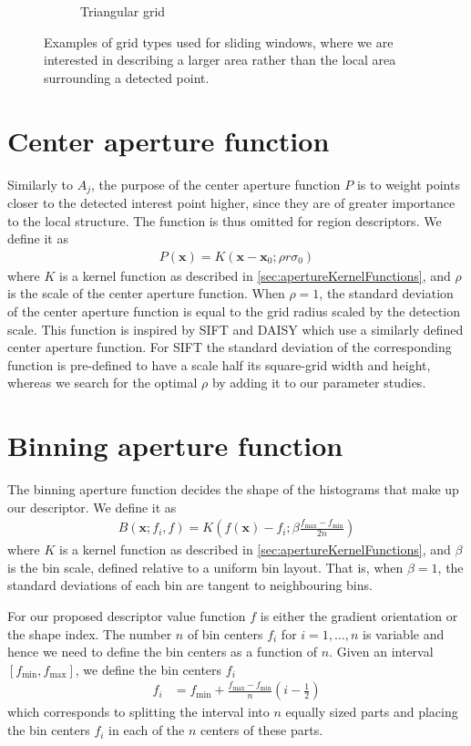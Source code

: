 \documentclass[thesis.tex]{subfiles}
\def\x{\mathbf{x}}
\begin{document}
\begin{figure}[tb]
\begin{subfigure}[t]{0.45\textwidth}
		\caption{Triangular grid}
		\label{fig:gridTypeTriangle}
	\end{subfigure}
	\caption{Examples of grid types used for sliding windows, where we are interested in describing a larger area rather than the local area surrounding a detected point.}
\label{fig:gridTypeWindow}
\end{figure}
%
\section{Center aperture function}
\label{sec:centerApertureFunction}
%
Similarly to $A_j$, the purpose of the center aperture function $P$ is to weight points closer to the detected interest point higher, since they are of greater importance to the local structure. The function is thus omitted for region descriptors. We define it as
%
\begin{align}
P(\x) = K(\x - \x_0; \rho r \sigma_0)
\end{align}
%
where $K$ is a kernel function as described in \ref{sec:apertureKernelFunctions}, and $\rho$ is the scale of the center aperture function. When $\rho = 1$, the standard deviation of the center aperture function is equal to the grid radius scaled by the detection scale. This function is inspired by SIFT \cite{lowe2004distinctive} and DAISY \cite{tola2008fast} which use a similarly defined center aperture function. For SIFT the standard deviation of the corresponding function is pre-defined to have a scale half its square-grid width and height, whereas we search for the optimal $\rho$ by adding it to our parameter studies.
%
\section{Binning aperture function}
\label{sec:binningApertureFunction}
%
The binning aperture function decides the shape of the histograms that make up our descriptor. We define it as
\begin{align}
	B(\x; f_i, f) = K \left( f(\x) - f_i; \beta \frac{f_\text{max} - f_\text{min}}{2n} \right)
\end{align}
where $K$ is a kernel function as described in \ref{sec:apertureKernelFunctions}, and $\beta$ is the bin scale, defined relative to a uniform bin layout. That is, when $\beta = 1$, the standard deviations of each bin are tangent to neighbouring bins.

For our proposed descriptor value function $f$ is either the gradient orientation or the shape index. The number $n$ of bin centers $f_i$ for $i = 1,\hdots,n$ is variable and hence we need to define the bin centers as a function of $n$. Given an interval $[f_\text{min},f_\text{max}]$, we define the bin centers $f_i$
\begin{align}
	\label{eq:binCenters}
	f_i &= f_\text{min} + \frac{f_\text{max}-f_\text{min}}{n} \left(i - \frac{1}{2} \right)
\end{align}
which corresponds to splitting the interval into $n$ equally sized parts and placing the bin centers $f_i$ in each of the $n$ centers of these parts.
\end{document}
